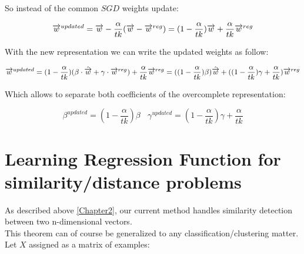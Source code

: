 So instead of the common $SGD$ weights update:

\begin{equation}
\\ \overrightarrow{w}^{updated} = \overrightarrow{w} - \frac{\alpha}{tk}(
\overrightarrow{w} - \overrightarrow{w}^{reg})
\\ \\= (1-\frac{\alpha}{tk})\overrightarrow{w} + \frac{\alpha}{tk}\overrightarrow{w}^{reg}
\end{equation}

With the new representation we can write the updated weights as follow:

\begin{equation}
\\ \overrightarrow{w}^{updated} = (1-\frac{\alpha}{tk})(\beta \cdot \hat{\overrightarrow{w}} + \gamma \cdot \overrightarrow{w}^{reg}) +  \frac{\alpha}{tk}\overrightarrow{w}^{reg}
\\\\= ((1-\frac{\alpha}{tk})\beta)\hat{\overrightarrow{w}} + 
((1-\frac{\alpha}{tk})\gamma
+\frac{\alpha}{tk})\overrightarrow{w}^{reg}
\end{equation}

Which allows to separate both coefficients of the overcomplete representation:

\begin{equation}
\beta^{updated} = (1-\frac{\alpha}{tk})\beta \:\:\:\: \gamma^{updated} = (1-\frac{\alpha}{tk})\gamma+\frac{\alpha}{tk}
\end{equation}

\vskip20pt









\section{Learning Regression Function for similarity/distance problems}

As described above \ref{Chapter2}, our current method handles similarity detection between two n-dimensional vectors.\\ This theorem can of course be generalized to any classification/clustering matter.
\\

Let $X$ assigned as a matrix of examples:\\ 

